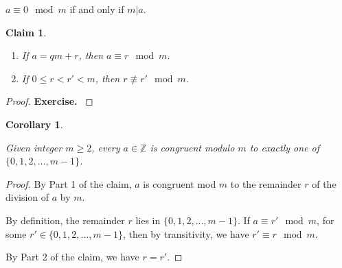 \documentclass[a4paper,12pt]{report}
\newcounter{statement}
\numberwithin{statement}{chapter}
\newtheorem{claim}[statement]{Claim}
\newtheorem{cor}[statement]{Corollary}
\numberwithin{equation}{chapter}
\numberwithin{section}{chapter}
\numberwithin{subsection}{section}
\begin{document}
$a \equiv 0 \mod m$ if and only if $m | a$.


\begin{claim}
\label{claim:congremainder}


\begin{enumerate}
\item 
If $a = qm + r$, then $a \equiv r \mod m$.

\item 
If $0 \leq r < r' < m$, then $r \not\equiv r' \mod m$.
\end{enumerate}
\end{claim}
\begin{proof}
 {\bf 
Exercise.
} 
\end{proof}
\begin{cor}
\label{congremainder}



Given integer $m \geq 2$, every $a \in \mathbb{Z}$ is congruent modulo $m$
to exactly one of $\{0, 1, 2, \ldots, m - 1\}$.
\end{cor}
\begin{proof}

By Part 1 of the claim, $a$ is congruent mod $m$ to the remainder $r$
of the division of $a$ by $m$.




By definition, the remainder $r$ lies in $\{0, 1, 2, \ldots, m - 1\}$.
If $a \equiv r' \mod m$, for some $r' \in \{0, 1, 2, \ldots, m - 1\}$,
then by transitivity, we have $r' \equiv r \mod m$.




By Part 2 of the claim, we have $r = r'$.


\end{proof}
\end{document}
